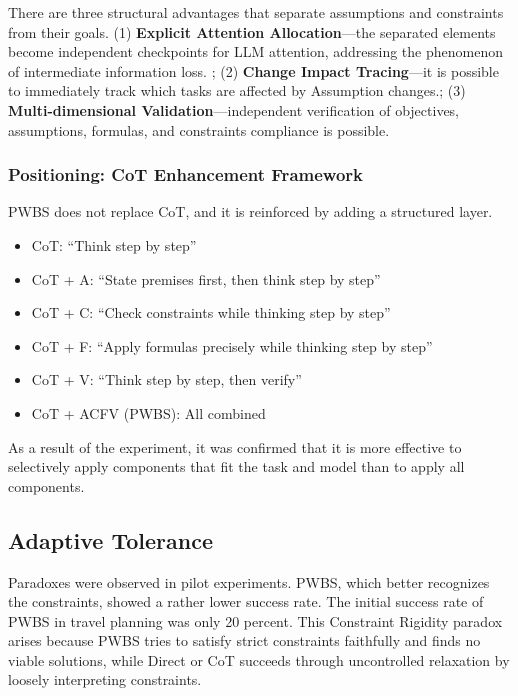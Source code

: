 \documentclass[11pt,a4paper]{article}
\begin{document}
There are three structural advantages that separate assumptions and constraints from their goals. (1) \textbf{Explicit Attention Allocation}---the separated elements become independent checkpoints for LLM attention, addressing the phenomenon of intermediate information loss. \citep{liu2024lost}; (2) \textbf{Change Impact Tracing}---it is possible to immediately track which tasks are affected by Assumption changes.; (3) \textbf{Multi-dimensional Validation}---independent verification of objectives, assumptions, formulas, and constraints compliance is possible.

\subsubsection{Positioning: CoT Enhancement Framework}

PWBS does not replace CoT, and it is reinforced by adding a structured layer.

\begin{itemize}[leftmargin=2em]
  \item CoT: ``Think step by step''
  \item CoT + A: ``State premises first, then think step by step''
  \item CoT + C: ``Check constraints while thinking step by step''
  \item CoT + F: ``Apply formulas precisely while thinking step by step''
  \item CoT + V: ``Think step by step, then verify''
  \item CoT + ACFV (PWBS): All combined
\end{itemize}

As a result of the experiment, it was confirmed that it is more effective to selectively apply components that fit the task and model than to apply all components.

\subsection{Adaptive Tolerance}

Paradoxes were observed in pilot experiments. PWBS, which better recognizes the constraints, showed a rather lower success rate. The initial success rate of PWBS in travel planning was only 20 percent. This Constraint Rigidity paradox arises because PWBS tries to satisfy strict constraints faithfully and finds no viable solutions, while Direct or CoT succeeds through uncontrolled relaxation by loosely interpreting constraints.
\end{document}
